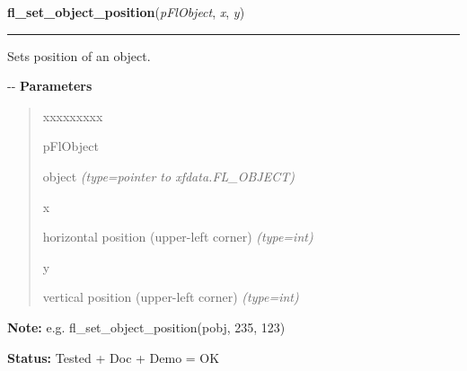 \hspace{.8\funcindent}\begin{boxedminipage}{\funcwidth}

    \raggedright \textbf{fl\_set\_object\_position}(\textit{pFlObject}, \textit{x}, \textit{y})

    \vspace{-1.5ex}

    \rule{\textwidth}{0.5\fboxrule}
\setlength{\parskip}{2ex}

Sets position of an object.

-{}-
\setlength{\parskip}{1ex}
      \textbf{Parameters}
      \vspace{-1ex}

      \begin{quote}
        \begin{Ventry}{xxxxxxxxx}

          \item[pFlObject]


object
            {\it (type=pointer to xfdata.FL\_OBJECT)}

          \item[x]


horizontal position (upper-left corner)
            {\it (type=int)}

          \item[y]


vertical position (upper-left corner)
            {\it (type=int)}

        \end{Ventry}

      \end{quote}

\textbf{Note:} 
e.g. fl\_set\_object\_position(pobj, 235, 123)


\textbf{Status:} 
Tested + Doc + Demo = OK


    \end{boxedminipage}

    \label{xformslib:flbasic:fl_get_object_size}

    \vspace{0.5ex}

